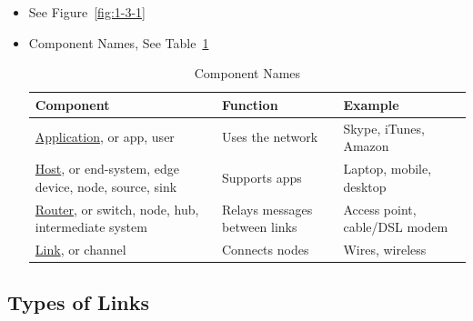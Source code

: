 \documentclass[12pt]{ctexart}   %
\begin{document}
	\begin{itemize}
		\item See Figure~\ref{fig:1-3-1}
		\item Component Names, See Table~\ref{table:1-3-1}
		\begin{table}[h] %
		\begin{center}
		\begin{tabular}{p{5cm}|p{3cm}|p{3cm}} %
		\hline
		\hline
		Component & Function & Example \\ %
		\hline %
		\underline{ Application}, or app, user & Uses the network & Skype, iTunes, Amazon\\
		\hline
		 \underline{Host}, or end-system, edge device, node, source, sink & Supports apps & Laptop, mobile, desktop\\
		\hline
		\underline{Router}, or switch, node, hub, intermediate system & Relays messages between links & Access point, cable/DSL modem\\
		\hline
		\underline{Link}, or channel & Connects nodes & Wires, wireless\\
		\hline
		\hline
		\end{tabular}
		\end{center}
		\caption{Component Names} %
		\label{table:1-3-1}
		\end{table}
	\end{itemize}
	
	\subsection{Types of Links}
	
\end{document}
